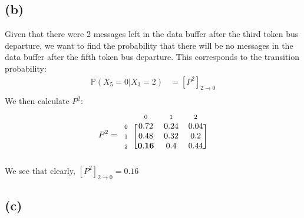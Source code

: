 \documentclass[12pt]{article}
\newcommand{\matindex}[1]{\mbox{\scriptsize#1}}%
\begin{document}
\subsection*{(b)}

Given that there were 2 messages left in the data buffer after the third token bus departure, we want to find the probability that there will be no messages in the data buffer after the fifth token bus departure. This corresponds to the transition probability: \begin{align*}
    \mathbb{P}(X_{5} = 0 | X_{3} = 2) &= \left[ P^{2} \right]_{2 \to 0} \\ 
\end{align*} We then calculate $P^{2}$: \begin{equation}
    P^{2} = \begin{blockarray}{cccc}
        & \matindex{0} & \matindex{1} & \matindex{2} \\ 
        \begin{block}{c[ccc]}
            \matindex{0} & 0.72 & 0.24 & 0.04 \\ 
            \matindex{1} & 0.48 & 0.32 & 0.2 \\ 
            \matindex{2} & \mathbf{0.16} & 0.4 & 0.44 \\ 
        \end{block}
    \end{blockarray}
\end{equation} We see that clearly, $\left[ P^{2} \right]_{2 \to 0} = 0.16$

\subsection*{(c)}
\end{document}

